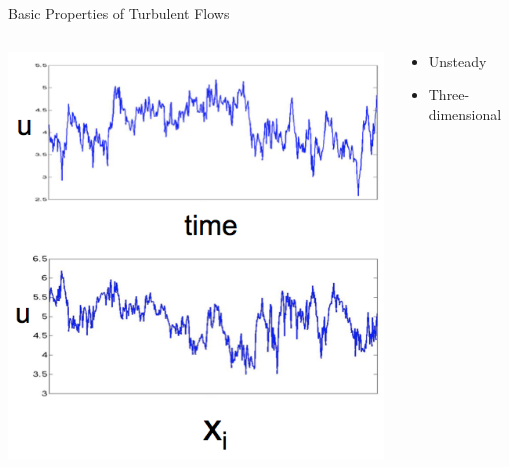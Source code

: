\begin{frame}{Basic Properties of Turbulent Flows}
\setlength{\fboxsep}{0pt}
\setlength{\fboxrule}{1pt}
\begin{columns}[T]
    \begin{column}{.65\textwidth}
      \includegraphics[width=\textwidth]{timetrace2.png}
    \end{column}
    \begin{column}{.35\textwidth}
    \begin{minipage}[c][.7\textheight][c]{\linewidth}
    \begin{itemize}
      \item Unsteady\newline\newline\newline\newline\newline\newline
      \item Three-dimensional	
      \end{itemize}
      \end{minipage}
    \end{column}
  \end{columns}

\end{frame}

